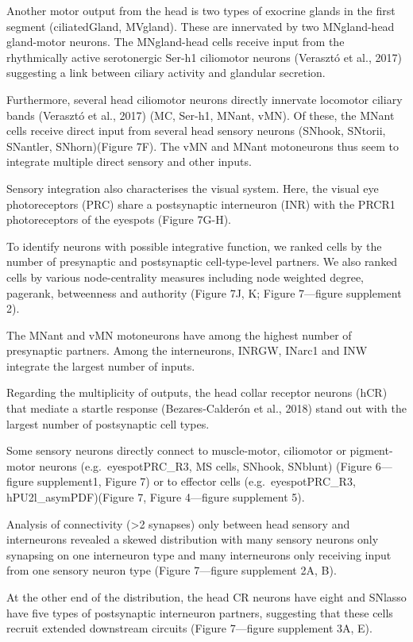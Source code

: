 \documentclass[
  11pt,
]{article}
\begin{document}
Another motor output from the head is two types of exocrine glands in
the first segment (ciliatedGland, MVgland). These are innervated by two
MNgland-head gland-motor neurons. The MNgland-head cells receive input
from the rhythmically active serotonergic Ser-h1 ciliomotor neurons
(Verasztó et al., 2017) suggesting a link between ciliary activity and
glandular secretion.

Furthermore, several head ciliomotor neurons directly innervate
locomotor ciliary bands (Verasztó et al., 2017) (MC, Ser-h1, MNant,
vMN). Of these, the MNant cells receive direct input from several head
sensory neurons (SNhook, SNtorii, SNantler, SNhorn)(Figure 7F). The vMN
and MNant motoneurons thus seem to integrate multiple direct sensory and
other inputs.

Sensory integration also characterises the visual system. Here, the
visual eye photoreceptors (PRC) share a postsynaptic interneuron (INR)
with the PRCR1 photoreceptors of the eyespots (Figure 7G-H).

To identify neurons with possible integrative function, we ranked cells
by the number of presynaptic and postsynaptic cell-type-level partners.
We also ranked cells by various node-centrality measures including node
weighted degree, pagerank, betweenness and authority (Figure 7J, K;
Figure 7---figure supplement 2).

The MNant and vMN motoneurons have among the highest number of
presynaptic partners. Among the interneurons, INRGW, INarc1 and INW
integrate the largest number of inputs.

Regarding the multiplicity of outputs, the head collar receptor neurons
(hCR) that mediate a startle response (Bezares-Calderón et al., 2018)
stand out with the largest number of postsynaptic cell types.

Some sensory neurons directly connect to muscle-motor, ciliomotor or
pigment-motor neurons (e.g.~eyespotPRC\_R3, MS cells, SNhook, SNblunt)
(Figure 6---figure supplement1, Figure 7) or to effector cells
(e.g.~eyespotPRC\_R3, hPU2l\_asymPDF)(Figure 7, Figure 4---figure
supplement 5).

Analysis of connectivity (\textgreater2 synapses) only between head
sensory and interneurons revealed a skewed distribution with many
sensory neurons only synapsing on one interneuron type and many
interneurons only receiving input from one sensory neuron type (Figure
7---figure supplement 2A, B).

At the other end of the distribution, the head CR neurons have eight and
SNlasso have five types of postsynaptic interneuron partners, suggesting
that these cells recruit extended downstream circuits (Figure 7---figure
supplement 3A, E).
\end{document}

